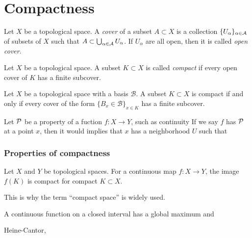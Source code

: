 \documentclass{../crs}
\begin{document}
\chapter{Compactness}
\begin{defn}
Let $X$ be a topological space.
A \emph{cover} of a subset $A\subset X$ is a collection $\{U_\alpha\}_{\alpha\in\mathcal{A}}$ of subsets of $X$ such that $A\subset\bigcup_{\alpha\in\mathcal{A}}U_\alpha$.
If $U_\alpha$ are all open, then it is called \emph{open cover}.
\end{defn}
\begin{defn}
Let $X$ be a topological space.
A subset $K\subset X$ is called \emph{compact} if every open cover of $K$ has a finite subcover.
\end{defn}
\begin{prop}
Let $X$ be a topological space with a basis $\mathcal{B}$.
A subset $K\subset X$ is compact if and only if every cover of the form $\{B_x\in\mathcal{B}\}_{x\in K}$ has a finite subcover.
\end{prop}
\begin{rmk}
Let $\mathcal{P}$ be a property of a fuction $f\colon X\to Y$, such as continuity
If we say $f$ has $\mathcal{P}$ at a point $x$, then it would implies that $x$ has a neighborhood $U$ such that 
\end{rmk}

\subsection{Properties of compactness}
\begin{thm}
Let $X$ and $Y$ be topological spaces.
For a continuous map $f\colon X\to Y$, the image $f(K)$ is compact for compact $K\subset X$.
\end{thm}

\begin{rmk}
This is why the term ``compact space'' is widely used.
\end{rmk}

\begin{cor}
A continuous function on a closed interval has a global maximum and
\end{cor}

Heine-Cantor,
\end{document}
